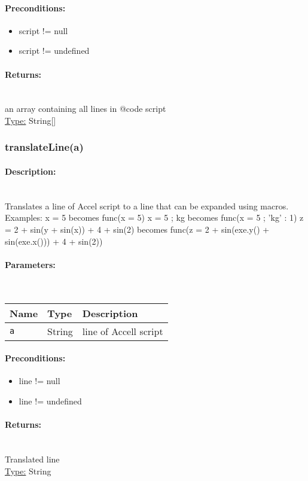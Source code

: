 \paragraph{Preconditions:} 
\begin{itemize}  
\item  script != null
\item  script != undefined
\end{itemize}  
\paragraph{Returns:} \hfill \\ 
an array containing all lines in {@code script}\\ 
\underline{Type:} String[]
\subsubsection{translateLine(a)} 
\paragraph{Description:} \hfill \\ 
Translates a line of Accel script to a line that can be expanded using macros.
Examples:
x = 5 becomes func(x = 5)
x = 5 ; kg becomes func(x = 5 ; {'kg' : 1})
z = 2 + sin(y + sin(x)) + 4 + sin(2) becomes func(z = 2 + sin(exe.y() + sin(exe.x())) + 4 + sin(2))
\paragraph{Parameters:} \hfill \\ 
\begin{tabular}{|l|l|l|}
\hline
\textbf{Name} & \textbf{Type} & \textbf{Description} \\ 
\hline
\texttt{a} & String & line of Accell script\\ 
\hline
\end{tabular}
\paragraph{Preconditions:} 
\begin{itemize}  
\item  line != null
\item  line != undefined
\end{itemize}  
\paragraph{Returns:} \hfill \\ 
Translated line\\ 
\underline{Type:} String
